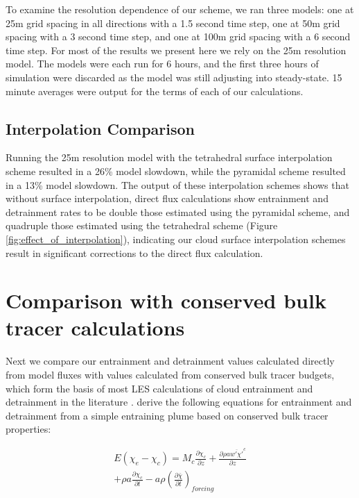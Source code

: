 \documentclass[12pt]{article}
\begin{document}
To examine the resolution dependence of our scheme, we ran three models: one at 
25m grid spacing in all directions with a 1.5 second time step, one at 50m grid 
spacing with a 3 second time step, and one at 100m grid spacing with a 6 second 
time step.  For most of the results we present here we rely on the 25m 
resolution model.  The models were each run for 6 hours, and the first 
three hours of simulation were discarded as the model was still adjusting into 
steady-state.  15 minute averages were output for the terms of each of our 
calculations.

\subsection{Interpolation Comparison}


Running the 25m resolution model with the tetrahedral surface interpolation 
scheme resulted in a 26\% model slowdown, while the pyramidal scheme resulted 
in a 13\% model slowdown.  The output of these interpolation schemes shows that 
without surface interpolation, direct flux calculations show entrainment and 
detrainment rates to be double those estimated using the pyramidal scheme, and 
quadruple those estimated using the tetrahedral scheme (Figure 
\ref{fig:effect_of_interpolation}), indicating our cloud surface interpolation 
schemes result in significant corrections to the direct flux calculation.


\section{Comparison with conserved bulk tracer calculations}

Next we compare our entrainment and detrainment values calculated directly from 
model fluxes with values calculated from conserved bulk tracer budgets, which 
form the basis of most LES calculations of cloud entrainment and detrainment in 
the literature \citep{Siebesma2003, Rooy2008}.  \cite{Siebesma1995} derive the 
following equations for entrainment and detrainment from a simple entraining 
plume based on conserved bulk tracer properties:

\begin{equation}
  \label{eq:entrainment}
  \begin{split}
    E (\chi_e - \chi_c) 
    = M_c \frac{\partial \chi_c}{\partial z}
    + \frac{\partial \rho a \overline{w' \chi'}^c}{\partial z} \\
    + \rho a \frac{\partial \chi_c}{\partial t}
    - a \rho \left(\frac{\partial \bar{\chi}}{\partial t}\right)_{forcing}
  \end{split}
\end{equation}
\end{document}
